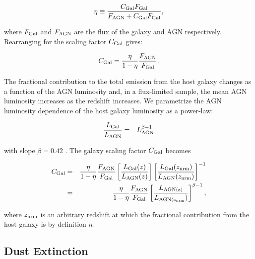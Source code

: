 \begin{eqnarray}
  \eta \equiv \frac{C_{\rm Gal}F_{\rm Gal}}{F_{\rm AGN} + C_{\rm Gal}F_{\rm Gal}},
\end{eqnarray}

where $F_{\rm Gal}$ and $F_{\rm AGN}$ are the flux of the galaxy and \ac{AGN} respectively. 
Rearranging for the scaling factor $C_{\rm Gal}$ gives:

\begin{eqnarray}
  C_{\rm Gal} = \frac{\eta}{1 - \eta} \frac{F_{\rm AGN}}{F_{\rm Gal}}.
\end{eqnarray}

The fractional contribution to the total emission from the host galaxy changes as a function of the \ac{AGN} luminosity and, in a flux-limited sample, the mean \ac{AGN} luminosity increases as the redshift increases. 
We parametrize the \ac{AGN} luminosity dependence of the host galaxy luminosity as a power-law:

\begin{eqnarray}
  \label{eq:lgal}
  \frac{L_{\rm Gal}}{L_{\rm AGN}} &=& L_{\rm AGN}^{\beta - 1} 
\end{eqnarray}

with slope $\beta=0.42$ \citep{maddox06}. 
The galaxy scaling factor $C_{\rm Gal}$ becomes 

\begin{eqnarray}
  C_{\rm Gal} &=& \frac{\eta}{1 - \eta} \frac{F_{\rm AGN}}{F_{\rm Gal}} \left[ \frac{ L_{\rm Gal}(z)} {L_{\rm AGN}(z)} \right] \left[ \frac{ L_{\rm Gal}(z_{\rm nrm})} {L_{\rm AGN}(z_{\rm nrm})} \right]^{-1} \\
  &=& \frac{\eta}{1 - \eta} \frac{F_{\rm AGN}}{F_{\rm Gal}} \left[ \frac{L_{\rm AGN(z)}} {L_{\rm AGN(z_{\rm nrm}})} \right]^{\beta -1}, 
\end{eqnarray}

where $z_{\rm nrm}$ is an arbitrary redshift at which the fractional contribution from the host galaxy is by definition $\eta$. 

\subsection{Dust Extinction}
\label{sec:sed-extinction} 

